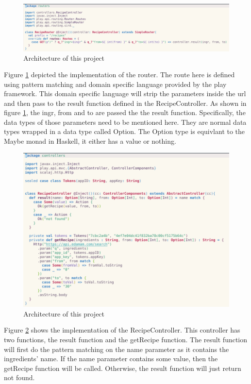\documentclass{article}
\begin{document}
\begin{normalsize}
  \begin{figure}[H]
    \centeringng
    \centerline{\includegraphics[scale=0.6]{router}}
    \caption{Architecture of this project}
    \label{fig:router}
  \end{figure}
  Figure \ref{fig:router} depicted the implementation of the router. The route
  here is defined using pattern matching and domain specific language provided
  by the play framework. This domain specific language will strip the parameters
  inside the url and then pass to the result function defined in the
  RecipeController. As shown in figure \ref{fig:router}, the ingr, from and to
  are passed the the result function. Specifically, the data types of those
  parameters need to be mentioned here. They are normal data types wrapped in a
  data type called Option. The Option type is equivlant to the Maybe monad in
  Haskell, it either has a value or nothing.
  

  \begin{figure}[H]
    \centeringng
    \centerline{\includegraphics[scale=0.7]{controller}}
    \caption{Architecture of this project}
    \label{fig:controller}
  \end{figure}
  Figure \ref{fig:controller} shows the implementation of the RecipeController.
  This controller has two functions, the result function and the getRecipe
  function. The result function will first do the pattern matching on the name
  parameter as it contains the ingredients' name. If the name parameter contains
  some value, then the getRecipe function will be called. Otherwise, the result
  function will just return not found.


\end{normalsize}
\end{document}
